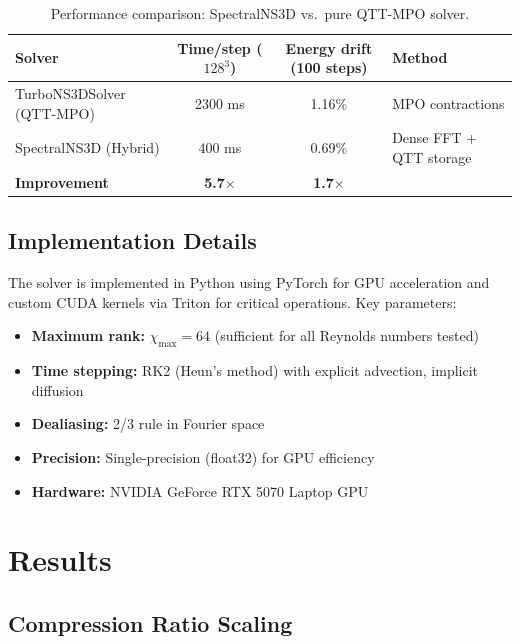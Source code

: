 \documentclass[preprint,12pt,authoryear]{elsarticle}
\theoremstyle{definition}
\begin{document}
\begin{table}[htbp]
\centering
\caption{Performance comparison: SpectralNS3D vs.\ pure QTT-MPO solver.}
\label{tab:performance}
\begin{tabular}{lccl}
\toprule
Solver & Time/step ($128^3$) & Energy drift (100 steps) & Method \\
\midrule
TurboNS3DSolver (QTT-MPO) & 2300 ms & 1.16\% & MPO contractions \\
SpectralNS3D (Hybrid) & 400 ms & 0.69\% & Dense FFT + QTT storage \\
\midrule
\textbf{Improvement} & \textbf{5.7$\times$} & \textbf{1.7$\times$} & \\
\bottomrule
\end{tabular}
\end{table}

\subsection{Implementation Details}

The solver is implemented in Python using PyTorch for GPU acceleration and custom CUDA kernels via Triton for critical operations.
Key parameters:

\begin{itemize}
    \item \textbf{Maximum rank:} $\chi_{\max} = 64$ (sufficient for all Reynolds numbers tested)
    \item \textbf{Time stepping:} RK2 (Heun's method) with explicit advection, implicit diffusion
    \item \textbf{Dealiasing:} 2/3 rule in Fourier space
    \item \textbf{Precision:} Single-precision (float32) for GPU efficiency
    \item \textbf{Hardware:} NVIDIA GeForce RTX 5070 Laptop GPU
\end{itemize}

\section{Results}
\label{sec:results}

\subsection{Compression Ratio Scaling}
\end{document}

